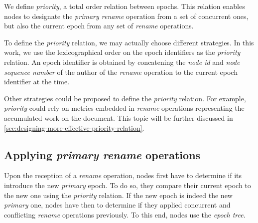\documentclass[sigplan,10pt]{acmart}
\begin{document}
We define \emph{priority}, a total order relation between epochs.
This relation enables nodes to designate the \emph{primary rename} operation from a set of concurrent ones, but also the current epoch from any set of \emph{rename} operations.

To define the \emph{priority} relation, we may actually choose different strategies.
In this work, we use the lexicographical order on the epoch identifiers as the \emph{priority} relation.
An epoch identifier is obtained by concatening the \emph{node id} and \emph{node sequence number} of the author of the \emph{rename} operation to the current epoch identifier at the time.

Other strategies could be proposed to define the \emph{priority} relation.
For example, \emph{priority} could rely on metrics embedded in \emph{rename} operations representing the accumulated work on the document.
This topic will be further discussed in \autoref{sec:designing-more-effective-priority-relation}.

\subsection{Applying \emph{primary rename} operations}


Upon the reception of a \emph{rename} operation, nodes first have to determine if its introduce the new \emph{primary} epoch.
To do so, they compare their current epoch to the new one using the \emph{priority} relation.
If the new epoch is indeed the new \emph{primary} one, nodes have then to determine if they applied concurrent and conflicting \emph{rename} operations previously.
To this end, nodes use the \emph{epoch tree}.
\end{document}
